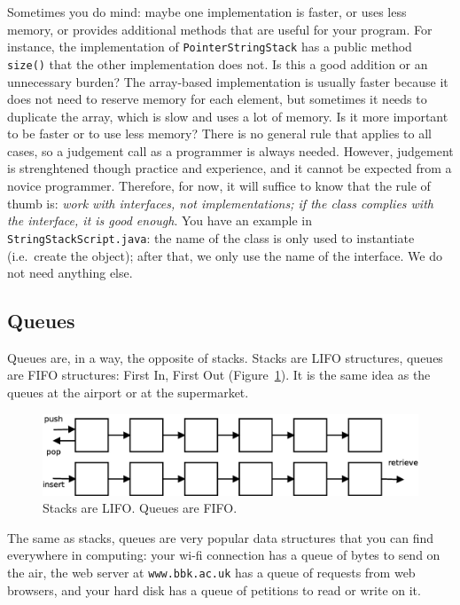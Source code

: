 Sometimes you do mind: maybe one implementation is faster, or uses
less memory, or provides additional methods that are useful for your
program. For instance, the implementation of \verb+PointerStringStack+
has a public method \verb+size()+ that the other implementation does
not. Is this a good addition or an unnecessary burden? The array-based
implementation is usually faster because it does not need to reserve
memory for each element, but sometimes it needs to duplicate the
array, which is slow and uses a lot of memory. Is it more important to
be faster or to use less memory? There is no
general rule that applies to all cases, so a judgement call as a
programmer is always needed. However, judgement is strenghtened though
practice and experience, and it cannot be expected from a novice
programmer. Therefore, for 
now, it will suffice to know that the rule of thumb is: \emph{work
  with interfaces, not implementations; if the class complies with the
  interface, it is good enough}. You have an example in
\verb+StringStackScript.java+: the name of the class is only used to
instantiate (i.e.~create the object); after that, we only use the name
of the interface. We do not need anything else. 

\subsection{Queues}
\label{sec:queues}

Queues are, in a way, the opposite of stacks. Stacks are LIFO
structures, queues are FIFO structures: First In, First 
Out (Figure~\ref{fig:fifolifo}). It is the
same idea as the queues at the airport or at the supermarket. 

\begin{figure}[hbtp]
  \centering
  \includegraphics[width=\textwidth]{gfx/fifo-lifo}
  \caption{Stacks are LIFO. Queues are FIFO.}
  \label{fig:fifolifo}
\end{figure}

The same as stacks, queues are very popular data structures that you
can find everywhere in computing: your wi-fi connection has a queue of
bytes to send on the air, the web server at \verb+www.bbk.ac.uk+ has a
queue of requests from web browsers, and your hard disk has a queue of
petitions to read or write on it. 

